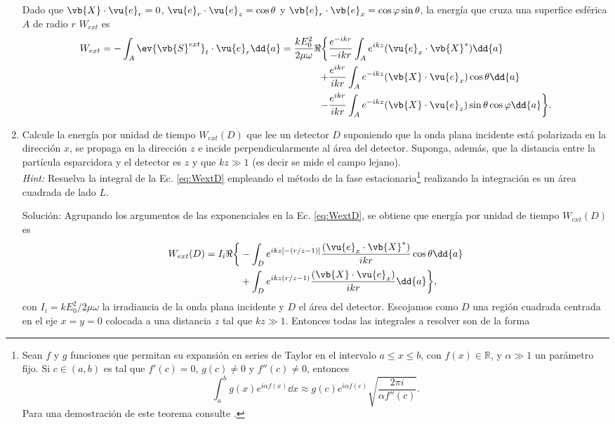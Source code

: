 \begin{enumerate}[label=\textbf{Ejercicio \thechapter.\arabic*},resume]
Dado que $\vb{X}\cdot\vu{e}_r = 0$, $\vu{e}_r\cdot\vu{e}_z = \cos\theta$ y $\vb{e}_r\cdot\vb{e}_x = \cos\varphi\sin\theta$, la energía que cruza una superfice  esférica $A$ de radio $r$ $W_{ext}$ es
%
\begin{align*}
W_{ext} = -\int_{A} \ev{\vb{S}^{ext}}_t\cdot\vu{e}_r\dd{a}
 = \frac{kE_0^2}{2\mu\omega}\Re\bigg\{&
\frac{e^{-ikr}}{-ikr}
	\int_A e^{ikz} (\vu{e}_x\cdot\vb{X}^*)\dd{a}\\
+&\frac{e^{ikr}}{ikr}
	\int_A e^{-ikz}(\vb{X}\cdot\vu{e}_x)\cos\theta\dd{a}\\
-&\frac{e^{ikr}}{ikr}
	\int_A e^{-ikz}(\vb{X}\cdot\vu{e}_z)\sin\theta\cos\varphi\dd{a}
	\bigg\}.
\end{align*}
%


\item Calcule la energía por unidad de tiempo $W_{ext}(D)$ que lee un detector $D$ suponiendo que la onda plana incidente está polarizada en la dirección $x$, se propaga en la dirección $z$ e incide perpendicularmente al área del detector. Suponga, además, que la distancia entre la partícula esparcidora y el detector es $z$ y que $kz\gg 1$ (es decir se mide el campo lejano).\\
\textit{Hint:} Resuelva la integral de la Ec. \ref{eq:WextD}  empleando el método de la fase estacionaria\footnote{Sean $f$ y $g$ funciones que permitan su expansión en series de Taylor en el intervalo $a\leq x\leq b$, con $f(x)\in\mathbb{R}$, y $\alpha\gg 1$ un parámetro fijo. Si $c\in(a,b)$ es tal que $f'(c)=0$, $g(c)\neq 0$ y  $f''(c)\neq 0$, entonces $$\int_a^bg(x)e^{i\alpha f(x)}\dd{x} \approx g(c)e^{i\alpha f(c)}\sqrt{\frac{2\pi i}{\alpha f''(c)}}.$$ Para una demostración de este teorema consulte \cite{hermans2011waterappendices}.} realizando la integración es un área cuadrada de lado $L$.
\label{ex:Wext_phase}
\item[\color{blue} Solución:]
Agrupando los argumentos de las exponenciales en la Ec. \eqref{eq:WextD}, se obtiene que energía por unidad de tiempo $W_{ext}(D)$ es
%
\begin{align*}
W_{ext}(D) =  I_i\Re\bigg\{&
	-\int_D e^{ikz[-(r/z-1)]}\frac{(\vu{e}_x\cdot\vb{X}^*)}{ikr}\cos\theta\dd{a}\notag\\
&+
	\int_D e^{ikz(r/z-1)} \frac{(\vb{X}\cdot\vu{e}_x)}{ikr}\dd{a}
\bigg\},
\end{align*}
con $I_i = kE_0^2 / 2\mu\omega$ la irradiancia de la onda plana incidente y $D$ el área del detector.  Escojamos como $D$ una región cuadrada centrada en el eje $x=y=0$ colocada a una distancia $z$ tal que $kz\gg 1$. Entonces todas las integrales a resolver son de la forma

\end{enumerate}
